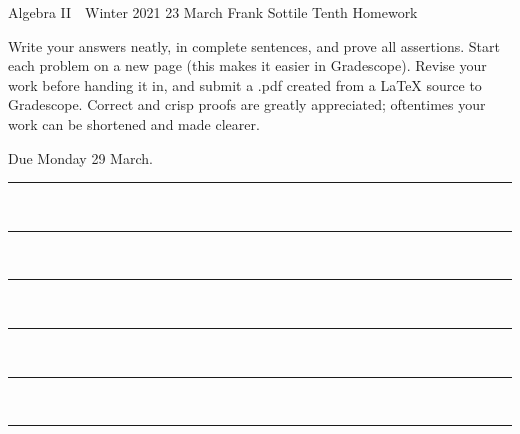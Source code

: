 \documentclass[12pt]{article}
\newcommand{\barsl}{\noindent\begin{minipage}[t]{575pt}
{\color{violet}\rule{575pt}{1.2pt}}\vspace{-5.7mm}\\
{\color{blue}\rule{575pt}{1.2pt}}\vspace{-5.7mm}\\
{\color{green}\rule{575pt}{1.2pt}}\vspace{-5.7mm}\\
{\color{yellow}\rule{575pt}{1.2pt}}\vspace{-5.7mm}\\
{\color{orange}\rule{575pt}{1.2pt}}\vspace{-5.7mm}\\
{\color{red}\rule{575pt}{1.2pt}}
\end{minipage}}
\begin{document}
\LARGE 
\noindent
Algebra II\ \ Winter 2021 \hfill 23 March\makebox[40pt][l]{\ }\newline
Frank Sottile \hfill
\Large\sf
Tenth Homework\makebox[40pt][l]{\ }
\vspace{5pt}
\normalsize

\noindent
Write your answers neatly, in complete sentences, and prove all assertions.
Start each problem on a new page (this makes it easier in Gradescope).
Revise your work before handing it in, and submit a .pdf  created from a LaTeX source to Gradescope.
Correct and crisp proofs are greatly appreciated; oftentimes your work can be shortened and made clearer.

\noindent
{\color{red}Due Monday 29 March.}\vspace{1pt}

\barsl
\end{document}
